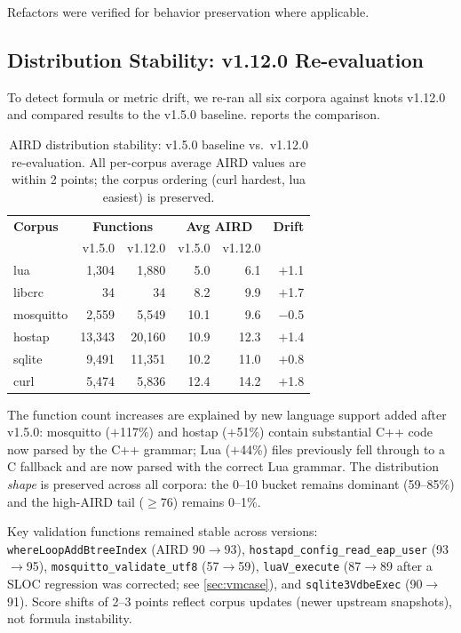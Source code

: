 \documentclass[10pt,twocolumn,letterpaper]{article}
\begin{document}
Refactors were verified for behavior preservation where applicable.

\subsection{Distribution Stability: v1.12.0 Re-evaluation}
\label{sec:reeval}

To detect formula or metric drift, we re-ran all six corpora against
knots v1.12.0 and compared results to the v1.5.0 baseline.
 reports the comparison.

\begin{table}[t]
\centering
\footnotesize
\begin{tabular}{@{}lrrrrr@{}}
\toprule
\textbf{Corpus} & \multicolumn{2}{c}{\textbf{Functions}}
  & \multicolumn{2}{c}{\textbf{Avg AIRD}} & \textbf{Drift} \\
  & v1.5.0 & v1.12.0 & v1.5.0 & v1.12.0 & \\
\midrule
lua       &  1{,}304 &  1{,}880 & 5.0  & 6.1  & $+$1.1 \\
libcrc    &     34   &     34   & 8.2  & 9.9  & $+$1.7 \\
mosquitto &  2{,}559 &  5{,}549 & 10.1 & 9.6  & $-$0.5 \\
hostap    & 13{,}343 & 20{,}160 & 10.9 & 12.3 & $+$1.4 \\
sqlite    &  9{,}491 & 11{,}351 & 10.2 & 11.0 & $+$0.8 \\
curl      &  5{,}474 &  5{,}836 & 12.4 & 14.2 & $+$1.8 \\
\bottomrule
\end{tabular}
\caption{AIRD distribution stability: v1.5.0 baseline vs.\ v1.12.0
re-evaluation.  All per-corpus average AIRD values are within 2 points;
the corpus ordering (curl hardest, lua easiest) is preserved.}
\label{tab:reeval}
\end{table}

The function count increases are explained by new language support
added after v1.5.0: mosquitto ($+$117\%) and hostap ($+$51\%) contain
substantial C++ code now parsed by the C++ grammar; Lua ($+$44\%)
files previously fell through to a C fallback and are now parsed
with the correct Lua grammar.  The distribution \emph{shape} is
preserved across all corpora: the 0--10 bucket remains dominant
(59--85\%) and the high-AIRD tail ($\geq$76) remains 0--1\%.

Key validation functions remained stable across versions:
\texttt{whereLoopAddBtreeIndex} (AIRD 90$\to$93),
\texttt{hostapd\_config\_read\_eap\_user} (93$\to$95),
\texttt{mosquitto\_validate\_utf8} (57$\to$59),
\texttt{luaV\_execute} (87$\to$89 after a SLOC regression was corrected;
see \cref{sec:vmcase}), and \texttt{sqlite3VdbeExec} (90$\to$91).
Score shifts of 2--3 points reflect corpus updates (newer upstream
snapshots), not formula instability.
\end{document}
